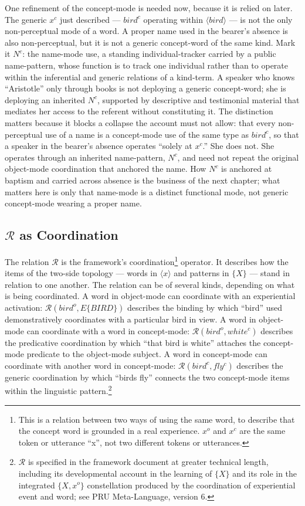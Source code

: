 \documentclass[12pt,a4paper]{article}
\begin{document}
One refinement of the concept-mode is needed now, because it is relied on later. The generic \(x^c\) just described --- \(bird^c\) operating within \(\langle bird \rangle\) --- is not the only non-perceptual mode of a word. A proper name used in the bearer's absence is also non-perceptual, but it is not a generic concept-word of the same kind. Mark it \(N^c\): the name-mode use, a standing individual-tracker carried by a public name-pattern, whose function is to track one individual rather than to operate within the inferential and generic relations of a kind-term. A speaker who knows ``Aristotle'' only through books is not deploying a generic concept-word; she is deploying an inherited \(N^c\), supported by descriptive and testimonial material that mediates her access to the referent without constituting it. The distinction matters because it blocks a collapse the account must not allow: that every non-perceptual use of a name is a concept-mode use of the same type as \(bird^c\), so that a speaker in the bearer's absence operates ``solely at \(x^c\).'' She does not. She operates through an inherited name-pattern, \(N^c\), and need not repeat the original object-mode coordination that anchored the name. How \(N^c\) is anchored at baptism and carried across absence is the business of the next chapter; what matters here is only that name-mode is a distinct functional mode, not generic concept-mode wearing a proper name.

\subsection{\texorpdfstring{\(\mathcal{R}\) as Coordination}{\textbackslash mathcal\{R\} as Coordination}}\label{mathcalr-as-coordination}

The relation \(\mathcal{R}\) is the framework's coordination\footnote{This is a relation between two ways of using the same word, to describe that the concept word is grounded in a real experience. \(x^o\) and \(x^c\) are the same token or utterance ``x'', not two different tokens or utterances.} operator. It describes how the items of the two-side topology --- words in \(\langle x \rangle\) and patterns in \(\{X\}\) --- stand in relation to one another. The relation can be of several kinds, depending on what is being coordinated. A word in object-mode can coordinate with an experiential activation: \(\mathcal{R}(bird^o, E\{BIRD\})\) describes the binding by which ``bird'' used demonstratively coordinates with a particular bird in view. A word in object-mode can coordinate with a word in concept-mode: \(\mathcal{R}(bird^o, white^c)\) describes the predicative coordination by which ``that bird is white'' attaches the concept-mode predicate to the object-mode subject. A word in concept-mode can coordinate with another word in concept-mode: \(\mathcal{R}(bird^c, fly^c)\) describes the generic coordination by which ``birds fly'' connects the two concept-mode items within the linguistic pattern.\footnote{\(\mathcal{R}\) is specified in the framework document at greater technical length, including its developmental account in the learning of \(\{X\}\) and its role in the integrated \(\{X, x^o\}\) constellation produced by the coordination of experiential event and word; see PRU Meta-Language, version 6.}
\end{document}
